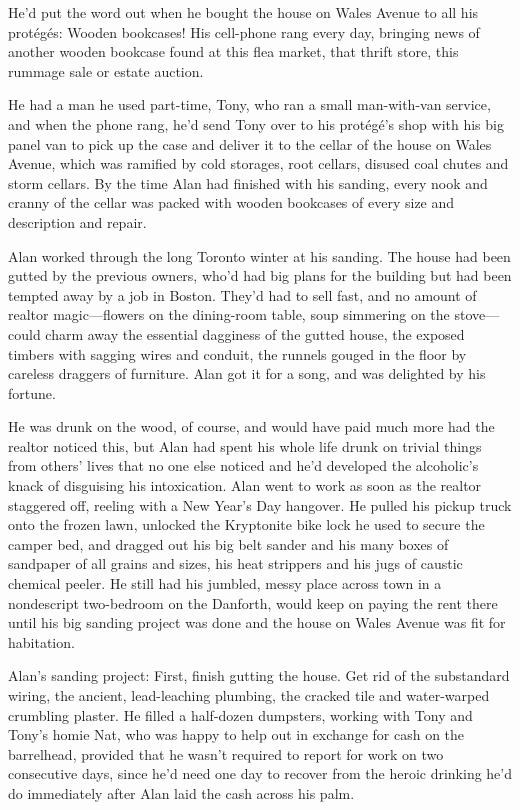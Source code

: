 He'd put the word out when he bought the house on Wales Avenue to all
his prot\'{e}g\'{e}s:  Wooden bookcases!  His cell-phone rang every day,
bringing news of another wooden bookcase found at this flea market,
that thrift store, this rummage sale or estate auction.

He had a man he used part-time, Tony, who ran a small man-with-van
service, and when the phone rang, he'd send Tony over to his
prot\'{e}g\'{e}'s shop with his big panel van to pick up the case and
deliver it to the cellar of the house on Wales Avenue, which was
ramified by cold storages, root cellars, disused coal chutes and storm
cellars.  By the time Alan had finished with his sanding, every nook
and cranny of the cellar was packed with wooden bookcases of every
size and description and repair.

Alan worked through the long Toronto winter at his sanding.  The house
had been gutted by the previous owners, who'd had big plans for the
building but had been tempted away by a job in Boston.  They'd had to
sell fast, and no amount of realtor magic---flowers on the dining-room
table, soup simmering on the stove---could charm away the essential
dagginess of the gutted house, the exposed timbers with sagging wires
and conduit, the runnels gouged in the floor by careless draggers of
furniture.  Alan got it for a song, and was delighted by his fortune.

He was drunk on the wood, of course, and would have paid much more had
the realtor noticed this, but Alan had spent his whole life drunk on
trivial things from others' lives that no one else noticed and he'd
developed the alcoholic's knack of disguising his intoxication.  Alan
went to work as soon as the realtor staggered off, reeling with a New
Year's Day hangover.  He pulled his pickup truck onto the frozen lawn,
unlocked the Kryptonite bike lock he used to secure the camper bed,
and dragged out his big belt sander and his many boxes of sandpaper of
all grains and sizes, his heat strippers and his jugs of caustic
chemical peeler.  He still had his jumbled, messy place across town in
a nondescript two-bedroom on the Danforth, would keep on paying the
rent there until his big sanding project was done and the house on
Wales Avenue was fit for habitation.

Alan's sanding project:  First, finish gutting the house.  Get rid of
the substandard wiring, the ancient, lead-leaching plumbing, the
cracked tile and water-warped crumbling plaster.  He filled a
half-dozen dumpsters, working with Tony and Tony's homie Nat, who was
happy to help out in exchange for cash on the barrelhead, provided
that he wasn't required to report for work on two consecutive days,
since he'd need one day to recover from the heroic drinking he'd do
immediately after Alan laid the cash across his palm.

